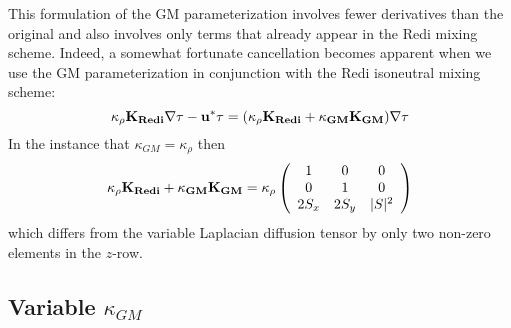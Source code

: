 This formulation of the GM parameterization involves fewer derivatives
than the original and also involves only terms that already appear in
the Redi mixing scheme. Indeed, a somewhat fortunate cancellation
becomes apparent when we use the GM parameterization in conjunction
with the Redi isoneutral mixing scheme:
\begin{equation}
\kappa_\rho \bf{K}_{Redi} \bf{\nabla} \tau
- u^* \tau = 
( \kappa_\rho \bf{K}_{Redi} + \kappa_{GM} \bf{K}_{GM} ) \bf{\nabla} \tau
\end{equation}
In the instance that $\kappa_{GM} = \kappa_{\rho}$ then
\begin{equation}
\kappa_\rho \bf{K}_{Redi} + \kappa_{GM} \bf{K}_{GM} =
\kappa_\rho
\left( \begin{array}{ccc}
1 & 0 & 0 \\
0 & 1 & 0 \\
2 S_x & 2 S_y & |S|^2 
\end{array}
\right)
\end{equation}
which differs from the variable Laplacian diffusion tensor by only
two non-zero elements in the $z$-row.




\subsection{Variable $\kappa_{GM}$}

